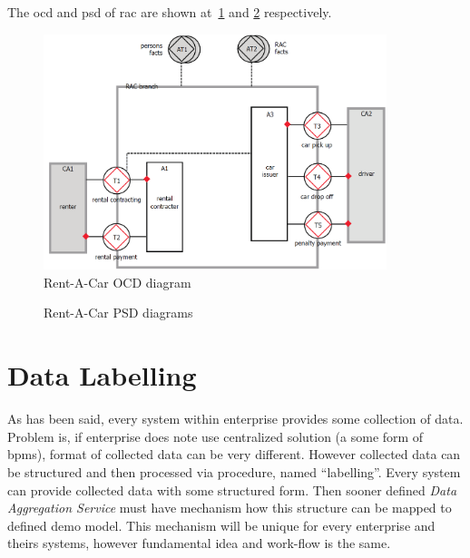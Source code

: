The \gls{ocd} and \gls{psd} of \gls{rac} are shown at~\cref{fig:rac-ocd} and \cref{fig:rac-psd} respectively.
\begin{figure}[ht!]
\centering
\includegraphics[width=10cm,keepaspectratio]{img/rac-ocd}
\caption{Rent-A-Car OCD diagram \cite{dietz-essence-2015}}
\label{fig:rac-ocd}
\end{figure}

\begin{figure}[ht!]
 \centering
 \qquad
 \caption{Rent-A-Car PSD diagrams \cite{dietz-essence-2015}}%
 \label{fig:rac-psd}%
\end{figure}
\newpage
\section{Data Labelling}
As has been said, every system within enterprise provides some collection of data. Problem is, if enterprise does note use centralized solution (a some form of \gls{bpms}), format of collected data can be very different. 
However collected data can be structured and then processed via procedure, named ``labelling''. Every system can provide collected data with some structured form. Then sooner defined \textit{Data Aggregation Service} must have mechanism how this structure can be mapped to defined \gls{demo} model. This mechanism will be unique for every enterprise and theirs systems, however fundamental idea and work-flow is the same.

